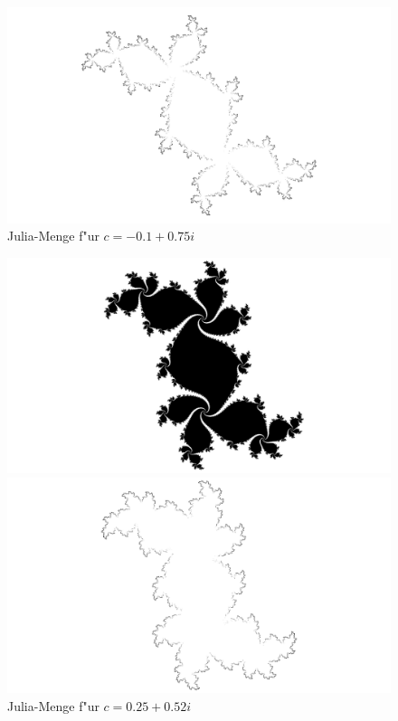 \begin{refsection}
\begin{figure}
\begin{center}
\bigskip

\includegraphics[width=\hsize]{julia/j-d.png}
\end{center}
\caption{Julia-Menge f"ur $c= -0.1+0.75i$}
\end{figure}

\begin{figure}
\begin{center}
\includegraphics[width=\hsize]{julia/e.png}

\bigskip

\includegraphics[width=\hsize]{julia/j-e.png}
\end{center}
\caption{Julia-Menge f"ur $c= 0.25+0.52i$}
\end{figure}


\end{refsection}
